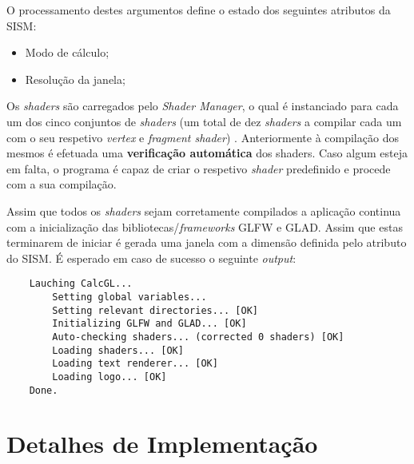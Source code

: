 O processamento destes argumentos define o estado dos seguintes atributos da \ac{SISM}:
\begin{itemize}
    \item Modo de cálculo;
    \item Resolução da janela;
\end{itemize}


Os \textit{shaders} são carregados pelo \textit{Shader Manager}, o qual é instanciado para cada um dos cinco conjuntos de \textit{shaders} (um total de dez \textit{shaders} a compilar cada um com o seu respetivo \textit{vertex} e \textit{fragment shader}) . 
Anteriormente à compilação dos mesmos é efetuada uma \textbf{verificação automática} dos shaders. Caso algum esteja em falta, o programa é capaz de criar o respetivo \textit{shader} predefinido e procede com a sua compilação.


Assim que todos os \textit{shaders} sejam corretamente compilados a aplicação continua com a inicialização das bibliotecas/\textit{frameworks} \ac{GLFW} e \ac{GLAD}. Assim que estas terminarem de iniciar é gerada uma janela com a dimensão definida pelo atributo do \ac{SISM}. 
É esperado em caso de sucesso o seguinte \textit{output}:

\begin{verbatim}
    Lauching CalcGL...
        Setting global variables...     
        Setting relevant directories... [OK]
        Initializing GLFW and GLAD... [OK]
        Auto-checking shaders... (corrected 0 shaders) [OK]
        Loading shaders... [OK]
        Loading text renderer... [OK]
        Loading logo... [OK]
    Done.
\end{verbatim}



\section{Detalhes de Implementação}
\label{sec::impl:detalhes}









